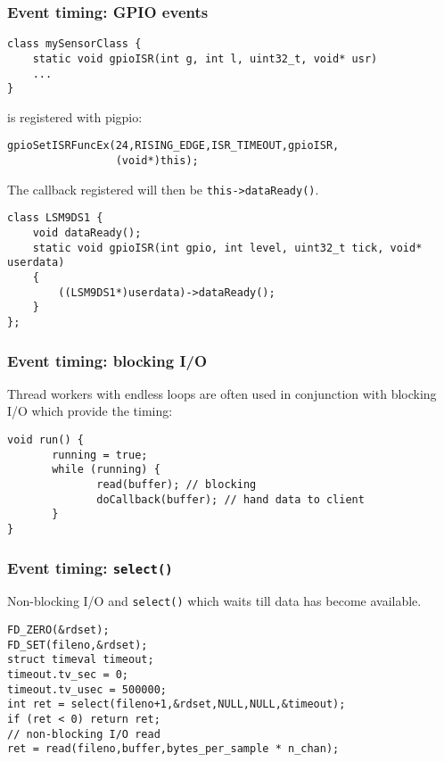 \documentclass[xcolor=dvipsnames]{beamer}
\begin{document}
\begin{frame}[fragile]
    \frametitle{Event timing: GPIO events}

    \begin{verbatim}
class mySensorClass {
    static void gpioISR(int g, int l, uint32_t, void* usr)
    ...
}
        \end{verbatim}
        is registered with pigpio:
        \begin{verbatim}
gpioSetISRFuncEx(24,RISING_EDGE,ISR_TIMEOUT,gpioISR,
                 (void*)this);
        \end{verbatim}
        The callback registered will then be \texttt{this->dataReady()}.
        \begin{verbatim}
class LSM9DS1 {
    void dataReady();
    static void gpioISR(int gpio, int level, uint32_t tick, void* userdata)
    {
        ((LSM9DS1*)userdata)->dataReady();
    }
};
        \end{verbatim}

\end{frame}




\begin{frame}[fragile]
\frametitle{Event timing: blocking I/O}
Thread workers with endless loops are often used in conjunction with blocking
I/O which provide the timing:
\begin{verbatim}
void run() {
       running = true;
       while (running) {
              read(buffer); // blocking
              doCallback(buffer); // hand data to client
       }
}
\end{verbatim}
\end{frame}



\begin{frame}[fragile]
  \frametitle{Event timing: \texttt{select()}}
Non-blocking I/O and \texttt{select()}
which waits till data has become available.
\begin{verbatim}
FD_ZERO(&rdset);
FD_SET(fileno,&rdset);
struct timeval timeout;
timeout.tv_sec = 0;
timeout.tv_usec = 500000;
int ret = select(fileno+1,&rdset,NULL,NULL,&timeout);
if (ret < 0) return ret;
// non-blocking I/O read
ret = read(fileno,buffer,bytes_per_sample * n_chan);
\end{verbatim}
\end{frame}
\end{document}
